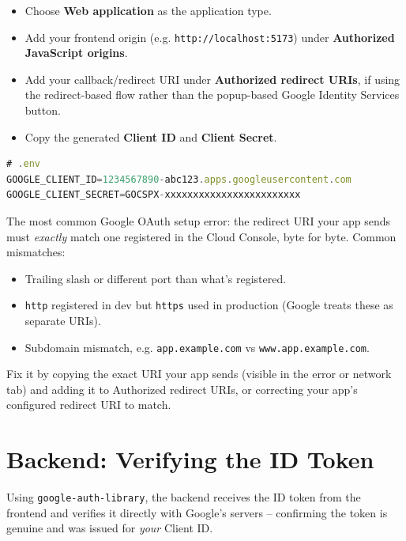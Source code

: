 \begin{itemize}
  \item Choose \textbf{Web application} as the application type.
  \item Add your frontend origin (e.g. \texttt{http://localhost:5173}) under \textbf{Authorized JavaScript origins}.
  \item Add your callback/redirect URI under \textbf{Authorized redirect URIs}, if using the redirect-based flow rather than the popup-based Google Identity Services button.
  \item Copy the generated \textbf{Client ID} and \textbf{Client Secret}.
\end{itemize}

\begin{lstlisting}[language=JavaScript]
# .env
GOOGLE_CLIENT_ID=1234567890-abc123.apps.googleusercontent.com
GOOGLE_CLIENT_SECRET=GOCSPX-xxxxxxxxxxxxxxxxxxxxxxxx
\end{lstlisting}

\begin{warnbox}
The most common Google OAuth setup error: the redirect URI your app sends must \emph{exactly} match one registered in the Cloud Console, byte for byte. Common mismatches:
\begin{itemize}
  \item Trailing slash or different port than what's registered.
  \item \texttt{http} registered in dev but \texttt{https} used in production (Google treats these as separate URIs).
  \item Subdomain mismatch, e.g. \texttt{app.example.com} vs \texttt{www.app.example.com}.
\end{itemize}
Fix it by copying the exact URI your app sends (visible in the error or network tab) and adding it to Authorized redirect URIs, or correcting your app's configured redirect URI to match.
\end{warnbox}

\section{Backend: Verifying the ID Token}

Using \texttt{google-auth-library}, the backend receives the ID token from the frontend and verifies it directly with Google's servers -- confirming the token is genuine and was issued for \emph{your} Client ID.

